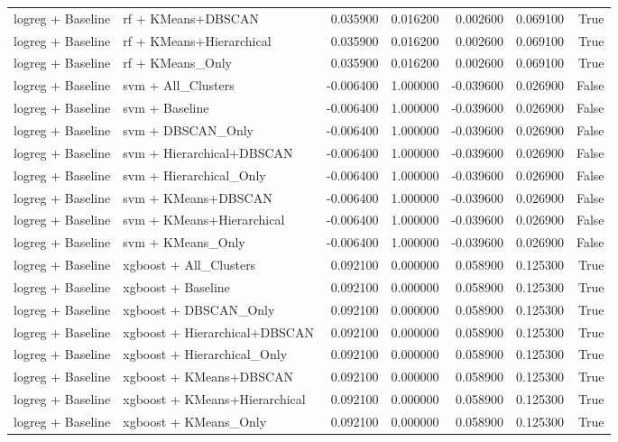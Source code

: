 \begin{tabular}{llrrrrr}
logreg + Baseline & rf + KMeans+DBSCAN & 0.035900 & 0.016200 & 0.002600 & 0.069100 & True \\
logreg + Baseline & rf + KMeans+Hierarchical & 0.035900 & 0.016200 & 0.002600 & 0.069100 & True \\
logreg + Baseline & rf + KMeans_Only & 0.035900 & 0.016200 & 0.002600 & 0.069100 & True \\
logreg + Baseline & svm + All_Clusters & -0.006400 & 1.000000 & -0.039600 & 0.026900 & False \\
logreg + Baseline & svm + Baseline & -0.006400 & 1.000000 & -0.039600 & 0.026900 & False \\
logreg + Baseline & svm + DBSCAN_Only & -0.006400 & 1.000000 & -0.039600 & 0.026900 & False \\
logreg + Baseline & svm + Hierarchical+DBSCAN & -0.006400 & 1.000000 & -0.039600 & 0.026900 & False \\
logreg + Baseline & svm + Hierarchical_Only & -0.006400 & 1.000000 & -0.039600 & 0.026900 & False \\
logreg + Baseline & svm + KMeans+DBSCAN & -0.006400 & 1.000000 & -0.039600 & 0.026900 & False \\
logreg + Baseline & svm + KMeans+Hierarchical & -0.006400 & 1.000000 & -0.039600 & 0.026900 & False \\
logreg + Baseline & svm + KMeans_Only & -0.006400 & 1.000000 & -0.039600 & 0.026900 & False \\
logreg + Baseline & xgboost + All_Clusters & 0.092100 & 0.000000 & 0.058900 & 0.125300 & True \\
logreg + Baseline & xgboost + Baseline & 0.092100 & 0.000000 & 0.058900 & 0.125300 & True \\
logreg + Baseline & xgboost + DBSCAN_Only & 0.092100 & 0.000000 & 0.058900 & 0.125300 & True \\
logreg + Baseline & xgboost + Hierarchical+DBSCAN & 0.092100 & 0.000000 & 0.058900 & 0.125300 & True \\
logreg + Baseline & xgboost + Hierarchical_Only & 0.092100 & 0.000000 & 0.058900 & 0.125300 & True \\
logreg + Baseline & xgboost + KMeans+DBSCAN & 0.092100 & 0.000000 & 0.058900 & 0.125300 & True \\
logreg + Baseline & xgboost + KMeans+Hierarchical & 0.092100 & 0.000000 & 0.058900 & 0.125300 & True \\
logreg + Baseline & xgboost + KMeans_Only & 0.092100 & 0.000000 & 0.058900 & 0.125300 & True \\

\end{tabular}
